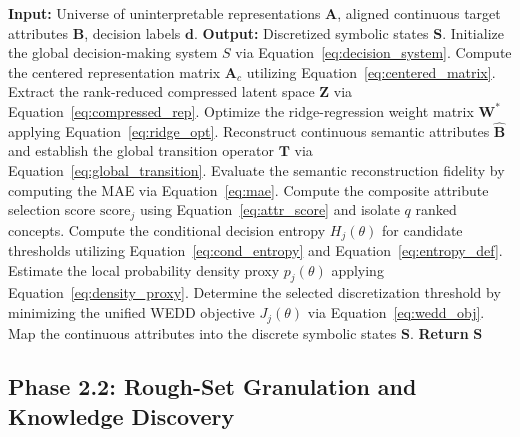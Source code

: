\documentclass[make,article,submit,pdftex,moreauthors]{Definitions/mdpi}
\newcommand{\matA}{\mathbf{A}}
\newcommand{\matB}{\mathbf{B}}
\newcommand{\hatB}{\widehat{\mathbf{B}}}
\newcommand{\matT}{\mathbf{T}}
\newcommand{\matW}{\mathbf{W}}
\newcommand{\matZ}{\mathbf{Z}}
\begin{document}
\begin{algorithm}[!ht]
\caption{Neural-to-Semantic Transition and WEDD Discretization (Phases 1 and 2.1)}
\label{alg:phase1_wedd}
\begin{algorithmic}[1]
\State \textbf{Input:} Universe of uninterpretable representations $\matA$, aligned continuous target attributes $\matB$, decision labels $\mathbf{d}$.
\State \textbf{Output:} Discretized symbolic states $\mathbf{S}$.
\State Initialize the global decision-making system $S$ via Equation~\eqref{eq:decision_system}.
\State Compute the centered representation matrix $\matA_c$ utilizing Equation~\eqref{eq:centered_matrix}.
\State Extract the rank-reduced compressed latent space $\matZ$ via Equation~\eqref{eq:compressed_rep}.
\State Optimize the ridge-regression weight matrix $\matW^{\ast}$ applying Equation~\eqref{eq:ridge_opt}.
\State Reconstruct continuous semantic attributes $\hatB$ and establish the global transition operator $\matT$ via Equation~\eqref{eq:global_transition}.
\State Evaluate the semantic reconstruction fidelity by computing the MAE via Equation~\eqref{eq:mae}.
\State Compute the composite attribute selection score $\mathrm{score}_j$ using Equation~\eqref{eq:attr_score} and isolate $q$ ranked concepts.
    \State Compute the conditional decision entropy $H_j(\theta)$ for candidate thresholds utilizing Equation~\eqref{eq:cond_entropy} and Equation~\eqref{eq:entropy_def}.
    \State Estimate the local probability density proxy $p_j(\theta)$ applying Equation~\eqref{eq:density_proxy}.
    \State Determine the selected discretization threshold by minimizing the unified WEDD objective $J_j(\theta)$ via Equation~\eqref{eq:wedd_obj}.
\EndFor
\State Map the continuous attributes into the discrete symbolic states $\mathbf{S}$.
\State \textbf{Return} $\mathbf{S}$
\end{algorithmic}
\end{algorithm}

\subsection{Phase 2.2: Rough-Set Granulation and Knowledge Discovery}
\label{subsec:rough_set_granulation}
\end{document}
